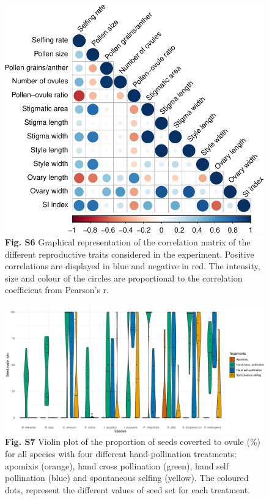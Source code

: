 \documentclass[
  12pt,
]{article}
\begin{document}
\begin{figure}
\centering
\includegraphics{Supp_Material_files/figure-latex/unnamed-chunk-14-1.pdf}
\caption{\textbf{Fig. S6} Graphical representation of the correlation
matrix of the different reproductive traits considered in the
experiment. Positive correlations are displayed in blue and negative in
red. The intensity, size and colour of the circles are proportional to
the correlation coefficient from Pearson's r.}
\end{figure}

\clearpage

\begin{figure}
\centering
\includegraphics{Supp_Material_files/figure-latex/unnamed-chunk-15-1.pdf}
\caption{\textbf{Fig. S7} Violin plot of the proportion of seeds
coverted to ovule (\%) for all species with four different
hand-pollination treatments: apomixis (orange), hand cross pollination
(green), hand self pollination (blue) and spontaneous selfing (yellow).
The coloured dots, represent the different values of seed set for each
treatment.}
\end{figure}
\end{document}
